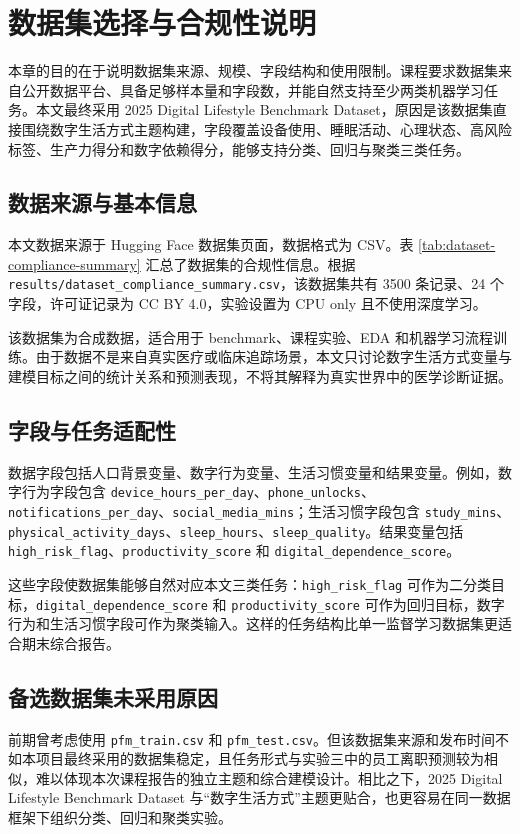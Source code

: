 \section{数据集选择与合规性说明}

本章的目的在于说明数据集来源、规模、字段结构和使用限制。课程要求数据集来自公开数据平台、具备足够样本量和字段数，并能自然支持至少两类机器学习任务。本文最终采用 2025 Digital Lifestyle Benchmark Dataset，原因是该数据集直接围绕数字生活方式主题构建，字段覆盖设备使用、睡眠活动、心理状态、高风险标签、生产力得分和数字依赖得分，能够支持分类、回归与聚类三类任务。

\subsection{数据来源与基本信息}

本文数据来源于 Hugging Face 数据集页面，数据格式为 CSV。表 \ref{tab:dataset-compliance-summary} 汇总了数据集的合规性信息。根据 \texttt{results/dataset\_compliance\_summary.csv}，该数据集共有 3500 条记录、24 个字段，许可证记录为 CC BY 4.0，实验设置为 CPU only 且不使用深度学习。



该数据集为合成数据，适合用于 benchmark、课程实验、EDA 和机器学习流程训练。由于数据不是来自真实医疗或临床追踪场景，本文只讨论数字生活方式变量与建模目标之间的统计关系和预测表现，不将其解释为真实世界中的医学诊断证据。

\subsection{字段与任务适配性}

数据字段包括人口背景变量、数字行为变量、生活习惯变量和结果变量。例如，数字行为字段包含 \texttt{device\_hours\_per\_day}、\texttt{phone\_unlocks}、\texttt{notifications\_per\_day}、\texttt{social\_media\_mins}；生活习惯字段包含 \texttt{study\_mins}、\texttt{physical\_activity\_days}、\texttt{sleep\_hours}、\texttt{sleep\_quality}。结果变量包括 \texttt{high\_risk\_flag}、\texttt{productivity\_score} 和 \texttt{digital\_dependence\_score}。

这些字段使数据集能够自然对应本文三类任务：\texttt{high\_risk\_flag} 可作为二分类目标，\texttt{digital\_dependence\_score} 和 \texttt{productivity\_score} 可作为回归目标，数字行为和生活习惯字段可作为聚类输入。这样的任务结构比单一监督学习数据集更适合期末综合报告。

\subsection{备选数据集未采用原因}

前期曾考虑使用 \texttt{pfm\_train.csv} 和 \texttt{pfm\_test.csv}。但该数据集来源和发布时间不如本项目最终采用的数据集稳定，且任务形式与实验三中的员工离职预测较为相似，难以体现本次课程报告的独立主题和综合建模设计。相比之下，2025 Digital Lifestyle Benchmark Dataset 与“数字生活方式”主题更贴合，也更容易在同一数据框架下组织分类、回归和聚类实验。
